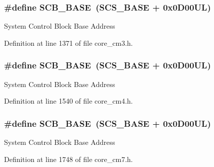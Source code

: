 \subsubsection[{\texorpdfstring{S\+C\+B\+\_\+\+B\+A\+SE}{SCB_BASE}}]{\setlength{\rightskip}{0pt plus 5cm}\#define S\+C\+B\+\_\+\+B\+A\+SE~({\bf S\+C\+S\+\_\+\+B\+A\+SE} +  0x0\+D00\+U\+L)}\hypertarget{group___c_m_s_i_s__core__base_gad55a7ddb8d4b2398b0c1cfec76c0d9fd}{}\label{group___c_m_s_i_s__core__base_gad55a7ddb8d4b2398b0c1cfec76c0d9fd}
System Control Block Base Address 

Definition at line 1371 of file core\+\_\+cm3.\+h.

\subsubsection[{\texorpdfstring{S\+C\+B\+\_\+\+B\+A\+SE}{SCB_BASE}}]{\setlength{\rightskip}{0pt plus 5cm}\#define S\+C\+B\+\_\+\+B\+A\+SE~({\bf S\+C\+S\+\_\+\+B\+A\+SE} +  0x0\+D00\+U\+L)}\hypertarget{group___c_m_s_i_s__core__base_gad55a7ddb8d4b2398b0c1cfec76c0d9fd}{}\label{group___c_m_s_i_s__core__base_gad55a7ddb8d4b2398b0c1cfec76c0d9fd}
System Control Block Base Address 

Definition at line 1540 of file core\+\_\+cm4.\+h.

\subsubsection[{\texorpdfstring{S\+C\+B\+\_\+\+B\+A\+SE}{SCB_BASE}}]{\setlength{\rightskip}{0pt plus 5cm}\#define S\+C\+B\+\_\+\+B\+A\+SE~({\bf S\+C\+S\+\_\+\+B\+A\+SE} +  0x0\+D00\+U\+L)}\hypertarget{group___c_m_s_i_s__core__base_gad55a7ddb8d4b2398b0c1cfec76c0d9fd}{}\label{group___c_m_s_i_s__core__base_gad55a7ddb8d4b2398b0c1cfec76c0d9fd}
System Control Block Base Address 

Definition at line 1748 of file core\+\_\+cm7.\+h.

